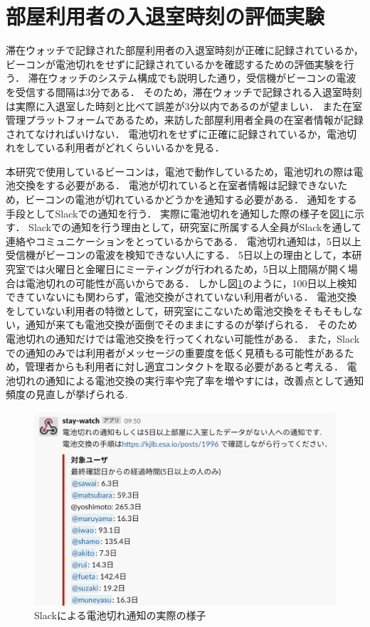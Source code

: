 



\section{部屋利用者の入退室時刻の評価実験}\label{3.3}
滞在ウォッチで記録された部屋利用者の入退室時刻が正確に記録されているか，ビーコンが電池切れをせずに記録されているかを確認するための評価実験を行う．
滞在ウォッチのシステム構成でも説明した通り，受信機がビーコンの電波を受信する間隔は3分である．
そのため，滞在ウォッチで記録される入退室時刻は実際に入退室した時刻と比べて誤差が3分以内であるのが望ましい．
また在室管理プラットフォームであるため，来訪した部屋利用者全員の在室者情報が記録されてなければいけない．
電池切れをせずに正確に記録されているか，電池切れをしている利用者がどれくらいいるかを見る．

本研究で使用しているビーコンは，電池で動作しているため，電池切れの際は電池交換をする必要がある．
電池が切れていると在室者情報は記録できないため，ビーコンの電池が切れているかどうかを通知する必要がある．
通知をする手段としてSlackでの通知を行う．
実際に電池切れを通知した際の様子を図\ref{batoff}に示す．
Slackでの通知を行う理由として，研究室に所属する人全員がSlackを通して連絡やコミュニケーションをとっているからである．
電池切れ通知は，5日以上受信機がビーコンの電波を検知できない人にする．
5日以上の理由として，本研究室では火曜日と金曜日にミーティングが行われるため，5日以上間隔が開く場合は電池切れの可能性が高いからである．
しかし図\ref{batoff}のように，100日以上検知できていないにも関わらず，電池交換がされていない利用者がいる．
電池交換をしていない利用者の特徴として，研究室にこないため電池交換をそもそもしない，通知が来ても電池交換が面倒でそのままにするのが挙げられる．
そのため電池切れの通知だけでは電池交換を行ってくれない可能性がある．
また，Slackでの通知のみでは利用者がメッセージの重要度を低く見積もる可能性があるため，管理者からも利用者に対し適宜コンタクトを取る必要があると考える．
電池切れの通知による電池交換の実行率や完了率を増やすには，改善点として通知頻度の見直しが挙げられる.
\begin{figure}[H]
  \begin{center}
    \includegraphics[width=160mm]{image/batoff.png}
    \caption{Slackによる電池切れ通知の実際の様子}
    \label{batoff}
  \end{center}
\end{figure}

